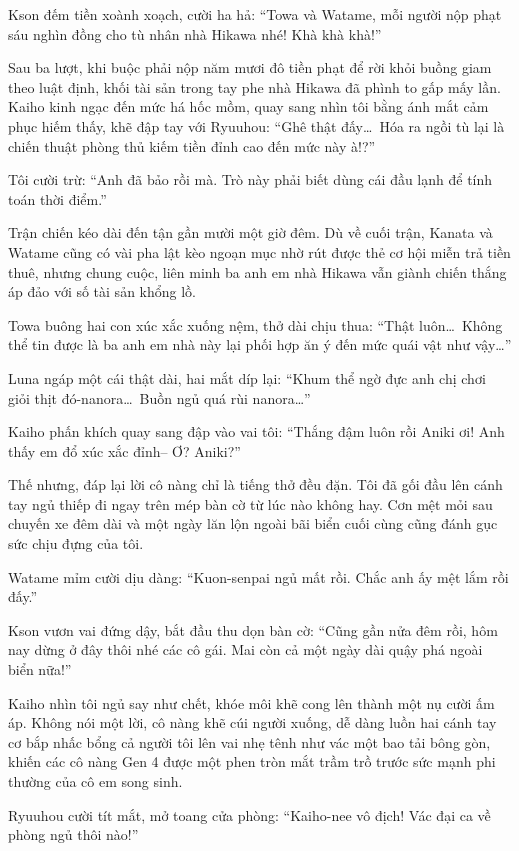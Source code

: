 \documentclass[../main.tex]{subfiles}
\begin{document}
Kson đếm tiền xoành xoạch, cười ha hả: ``Towa và Watame, mỗi người nộp phạt sáu nghìn đồng cho tù nhân nhà Hikawa nhé! Khà khà khà!''

Sau ba lượt, khi buộc phải nộp năm mươi đô tiền phạt để rời khỏi buồng giam theo luật định, khối tài sản trong tay phe nhà Hikawa đã phình to gấp mấy lần. Kaiho kinh ngạc đến mức há hốc mồm, quay sang nhìn tôi bằng ánh mắt cảm phục hiếm thấy, khẽ đập tay với Ryuuhou: ``Ghê thật đấy\dots\ Hóa ra ngồi tù lại là chiến thuật phòng thủ kiếm tiền đỉnh cao đến mức này à!?''

Tôi cười trừ: ``Anh đã bảo rồi mà. Trò này phải biết dùng cái đầu lạnh để tính toán thời điểm.''

Trận chiến kéo dài đến tận gần mười một giờ đêm. Dù về cuối trận, Kanata và Watame cũng có vài pha lật kèo ngoạn mục nhờ rút được thẻ cơ hội miễn trả tiền thuê, nhưng chung cuộc, liên minh ba anh em nhà Hikawa vẫn giành chiến thắng áp đảo với số tài sản khổng lồ.

Towa buông hai con xúc xắc xuống nệm, thở dài chịu thua: ``Thật luôn\dots\ Không thể tin được là ba anh em nhà này lại phối hợp ăn ý đến mức quái vật như vậy\dots''

Luna ngáp một cái thật dài, hai mắt díp lại: ``Khum thể ngờ đực anh chị chơi giỏi thịt đó-nanora\dots\ Buồn ngủ quá rùi nanora\dots''

Kaiho phấn khích quay sang đập vào vai tôi: ``Thắng đậm luôn rồi Aniki ơi! Anh thấy em đổ xúc xắc đỉnh-- Ơ? Aniki?''

Thế nhưng, đáp lại lời cô nàng chỉ là tiếng thở đều đặn. Tôi đã gối đầu lên cánh tay ngủ thiếp đi ngay trên mép bàn cờ từ lúc nào không hay. Cơn mệt mỏi sau chuyến xe đêm dài và một ngày lăn lộn ngoài bãi biển cuối cùng cũng đánh gục sức chịu đựng của tôi.

Watame mỉm cười dịu dàng: ``Kuon-senpai ngủ mất rồi. Chắc anh ấy mệt lắm rồi đấy.''

Kson vươn vai đứng dậy, bắt đầu thu dọn bàn cờ: ``Cũng gần nửa đêm rồi, hôm nay dừng ở đây thôi nhé các cô gái. Mai còn cả một ngày dài quậy phá ngoài biển nữa!''

Kaiho nhìn tôi ngủ say như chết, khóe môi khẽ cong lên thành một nụ cười ấm áp. Không nói một lời, cô nàng khẽ cúi người xuống, dễ dàng luồn hai cánh tay cơ bắp nhấc bổng cả người tôi lên vai nhẹ tênh như vác một bao tải bông gòn, khiến các cô nàng Gen 4 được một phen tròn mắt trầm trồ trước sức mạnh phi thường của cô em song sinh.

Ryuuhou cười tít mắt, mở toang cửa phòng: ``Kaiho-nee vô địch! Vác đại ca về phòng ngủ thôi nào!''
\end{document}
